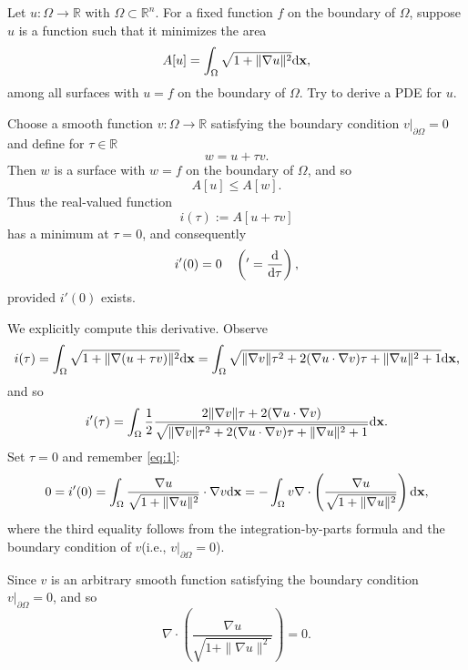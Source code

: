 \begin{pro}
  Let $u:\Omega\to\mathbb{R}$ with $\Omega\subset \mathbb{R}^n$.
  For a fixed function $f$ on the boundary of $\Omega$,
  suppose $u$ is a function such that it minimizes the area
  \begin{displaymath}
    A[u] = \int_{\Omega}\sqrt{1 + \|\nabla u\|^2}\mathrm{d} \mathbf{x},
  \end{displaymath}
  among all surfaces with $u=f$ on the boundary of $\Omega$.
  Try to derive a PDE for $u$.
\end{pro}

\begin{sol}
  Choose a smooth function $v:\Omega\to\mathbb{R}$
  satisfying the boundary condition $v|_{\partial\Omega} = 0$
  and define for $\tau\in\mathbb{R}$
  \begin{displaymath}
    w = u + \tau v.
  \end{displaymath}
  Then $w$ is a surface with $w=f$ on the boundary of $\Omega$,
  and so
  \begin{displaymath}
    A[u] \leq A[w].
  \end{displaymath}
  Thus the real-valued function
  \begin{displaymath}
    i(\tau) := A[u+\tau v]
  \end{displaymath}
  has a minimum at $\tau=0$,
  and consequently
  \begin{equation}
    \label{eq:1}
    i'(0)= 0 \quad \left( ' = \frac{\mathrm{d}}{\mathrm{d} \tau}\right),
  \end{equation}
  provided $i'(0)$ exists.

  We explicitly compute this derivative.
  Observe
  \begin{displaymath}
    i(\tau) = \int_{\Omega}\sqrt{1 + \|\nabla (u+\tau v)\|^2}\mathrm{d} \mathbf{x}
    = \int_{\Omega}\sqrt{\|\nabla v\|\tau^2 + 2(\nabla u\cdot\nabla v) \tau+\|\nabla u\|^2 + 1}\mathrm{d} \mathbf{x},
  \end{displaymath}
  and so
  \begin{displaymath}
    i'(\tau) = \int_{\Omega}\frac{1}{2}\frac{2\|\nabla v\|\tau + 2(\nabla u\cdot\nabla v)}{\sqrt{\|\nabla v\|\tau^2 + 2(\nabla u\cdot\nabla v) \tau+\|\nabla u\|^2 + 1}}\mathrm{d}\mathbf{x}.
  \end{displaymath}
  Set $\tau=0$ and remember \eqref{eq:1}:
  \begin{displaymath}
    0 = i'(0) = \int_{\Omega}\frac{\nabla u}{\sqrt{1 + \|\nabla u\|^2}}\cdot
    \nabla v\mathrm{d}\mathbf{x}
    = -\int_{\Omega}v\nabla\cdot\left( \frac{\nabla u}{\sqrt{1+\|\nabla u\|^2}}\right)\mathrm{d} \mathbf{x},
  \end{displaymath}
  where the third equality follows from the integration-by-parts formula
  and the boundary condition of $v$(i.e., $v|_{\partial\Omega}=0$).
  
  Since $v$ is an arbitrary smooth function
  satisfying the boundary condition $v|_{\partial \Omega}=0$,
  and so
  \begin{equation}
    \nabla\cdot\left( \frac{\nabla u}{\sqrt{1+\|\nabla u\|^2}}\right) = 0.
  \end{equation}
\end{sol}
